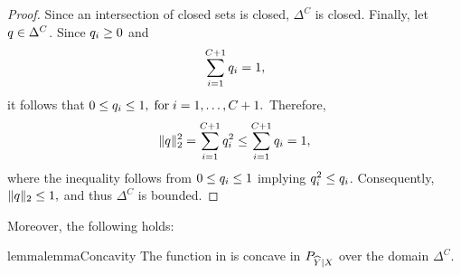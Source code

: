 \begin{proof}
    Since an intersection of closed sets is closed,
    $\Delta^C$ is closed. Finally, let $q\in\Delta^C$. Since $q_i\ge 0$ and
    \begin{align*}
        \sum_{i=1}^{C+1} q_i = 1,
    \end{align*}
    it follows that
    \(
    0 \le q_i \le 1,
    \;\text{for}\;
    i=1,\dots,C+1.
    \)
    Therefore,
    \begin{align*}
        \|q\|_2^2
        =
        \sum_{i=1}^{C+1} q_i^2
        \le
        \sum_{i=1}^{C+1} q_i
        =
        1,
    \end{align*}
    where the inequality follows from $0\le q_i\le 1$ implying
    $q_i^2\le q_i$. Consequently,
    \(
    \|q\|_2 \le 1,
    \)
    and thus $\Delta^C$ is bounded.
\end{proof}
Moreover, the following holds:
\begin{restatable}{lemma}{lemmaConcavity}
    \label{lemma:concavity}
    The function in  is concave in \(P_{\widehat{Y}|{X}}\) over the domain \(\Delta^{C}\).
\end{restatable}
